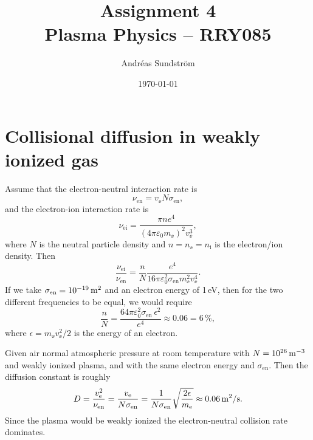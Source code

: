 \documentclass[11pt,a4paper, 
swedish, english %
]{article}
\begin{document}


\title{Assignment 4 \\
{\Large Plasma Physics -- RRY085}}
\author{Andréas Sundström}
\date\today%

\maketitle


\section{Collisional diffusion in weakly ionized gas}
Assume that the electron-neutral interaction rate is
\begin{equation}
\nu_{\text{en}}=v_\ee N \sigma_\text{en},
\end{equation}
and the electron-ion interaction rate is
\begin{equation}
\nu_\text{ei}=\frac{\pi n e^4}{(4\pi\varepsilon_0 m_\ee)^2v_\ee^3},
\end{equation}
where $N$ is the neutral particle density and $n=n_\ee=n_\text{i}$ is
the electron/ion density. Then
\begin{equation}
\frac{\nu_\text{ei}}{\nu_{\text{en}}}
=\frac{n}{N}\frac{e^4}
{16\pi\varepsilon_0^2\sigma_\text{en}m_\ee^2 v_\ee^4}.
\end{equation}
If we take $\sigma_\text{en}=\unit[10^{-19}]{m^2}$ and an electron
energy of 1\,eV, then for the two different frequencies to be equal,
we would require 
\begin{equation}
\frac{n}{N}=
\frac{64\pi\varepsilon_0^2
\sigma_\text{en}\,\epsilon^2}{e^4}
\approx 0.06 = 6\,\%,
\end{equation}
where $\epsilon =m_\ee v_\ee^2/2$ is the energy of an electron.

Given air normal atmospheric pressure at room temperature with
$N=\unit[10^{26}]{m^{-3}}$ and weakly ionized plasma, and with the
same electron energy and $\sigma_\text{en}$. Then the diffusion
constant is roughly 
\begin{equation}
D=\frac{v_\ee^2}{\nu_\text{en}}
=\frac{v_\ee}{N\sigma_\text{en}}
=\frac{1}{N\sigma_\text{en}}\sqrt{\frac{2\epsilon}{m_\ee}}
\approx \unit[0.06]{m^2/s}.
\end{equation}
Since the plasma would be weakly ionized the electron-neutral
collision rate dominates. 
\end{document}
